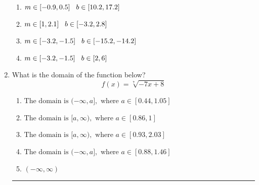 \documentclass[14pt]{extbook}
\newcommand{\litem}[1]{\item#1\hspace*{-1cm}\rule{\textwidth}{0.4pt}}
\begin{document}
\begin{enumerate}
{\begin{enumerate}[label=\Alph*.]
\item \( m \in [-0.9, 0.5] \hspace*{3mm} b \in [10.2, 17.2] \)
\item \( m \in [1, 2.1] \hspace*{3mm} b \in [-3.2, 2.8] \)
\item \( m \in [-3.2, -1.5] \hspace*{3mm} b \in [-15.2, -14.2] \)
\item \( m \in [-3.2, -1.5] \hspace*{3mm} b \in [2, 6] \)

\end{enumerate} }
\litem{
What is the domain of the function below?\[ f(x) = \sqrt[7]{-7 x + 8} \]\begin{enumerate}[label=\Alph*.]
\item \( \text{The domain is } (-\infty, a], \text{   where } a \in [0.44, 1.05] \)
\item \( \text{The domain is } [a, \infty), \text{   where } a \in [0.86, 1] \)
\item \( \text{The domain is } [a, \infty), \text{   where } a \in [0.93, 2.03] \)
\item \( \text{The domain is } (-\infty, a], \text{   where } a \in [0.88, 1.46] \)
\item \( (-\infty, \infty) \)


\end{enumerate}}
\end{enumerate}
\end{document}

